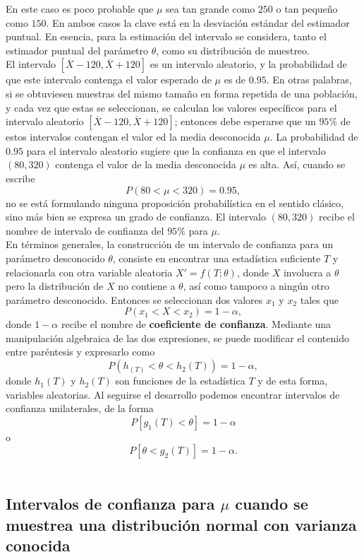 En este caso es poco probable que $\mu$ sea tan grande como $250$ o tan pequeño como $150$. En ambos casos la clave está en la desviación estándar del estimador puntual. En esencia, para la estimación del intervalo se considera, tanto el estimador puntual del parámetro $\theta$, como su distribución de muestreo.\\

El intervalo $[\overline{X}-120,\overline{X}+120]$ es un intervalo aleatorio, y la probabilidad de que este intervalo contenga el valor esperado de $\mu$ es de $0.95$.  En otras palabras, si se obtuviesen muestras del mismo tamaño en forma repetida de una población, y cada vez que estas se seleccionan, se calculan los valores específicos para el intervalo aleatorio $[\overline{X}-120,\overline{X}+120]$; entonces debe esperarse que un $95\%$ de estos intervalos contengan el valor ed la media desconocida $\mu$. La probabilidad de $0.95$ para el intervalo aleatorio sugiere que la confianza en que el intervalo $(80,320)$ contenga el valor de la media desconocida $\mu$ es alta. Así, cuando se escribe
$$P(80<\mu<320)=0.95,$$
no se está formulando ninguna proposición probabilística en el sentido clásico, sino más bien se expresa un grado de confianza. El intervalo $(80,320)$ recibe el nombre de intervalo de confianza del $95\%$ para $\mu$.\\

En términos generales, la construcción de un intervalo de confianza para un parámetro desconocido $\theta$, consiste en encontrar una estadística suficiente $T$ y relacionarla con otra variable aleatoria $X'=f(T;\theta)$, donde $X$ involucra a $\theta$ pero la distribución de $X$ no contiene a $\theta$, así como tampoco a ningún otro parámetro desconocido. Entonces se seleccionan dos valores $x_1$ y $x_2$ tales que 
$$P(x_1<X<x_2)=1-\alpha,$$
donde $1-\alpha$ recibe el nombre de \textbf{coeficiente de confianza}. Mediante una manipulación algebraica de las dos expresiones, se puede modificar el contenido entre paréntesis y expresarlo como
$$P(h_(T)<\theta<h_2(T))=1-\alpha,$$
donde $h_1(T)$ y $h_2(T)$ son funciones de la estadística $T$ y de esta forma, variables aleatorias. Al seguirse el desarrollo podemos encontrar intervalos de confianza unilaterales, de la forma
$$P\left[g_1(T)<\theta\right]=1-\alpha$$
o
$$P\left[\theta<g_2(T)\right]=1-\alpha.$$\\


\subsection{Intervalos de confianza para \boldmath $\mu$ cuando se muestrea una distribución normal con varianza conocida}


